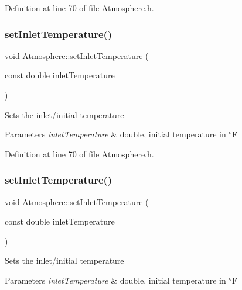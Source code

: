 Definition at line 70 of file Atmosphere.\+h.

\mbox{\label{class_atmosphere_a592bf7f82ea518fbd9da86d8f10cbc5c}} 
\subsubsection{\texorpdfstring{set\+Inlet\+Temperature()}{setInletTemperature()}\hspace{0.1cm}{\footnotesize\ttfamily [2/3]}}
{\footnotesize\ttfamily void Atmosphere\+::set\+Inlet\+Temperature (\begin{DoxyParamCaption}\item[{const double}]{inlet\+Temperature }\end{DoxyParamCaption})\hspace{0.3cm}{\ttfamily [inline]}}

Sets the inlet/initial temperature 
\begin{DoxyParams}{Parameters}
{\em inlet\+Temperature} & double, initial temperature in °F \\
\hline
\end{DoxyParams}


Definition at line 70 of file Atmosphere.\+h.

\mbox{\label{class_atmosphere_a592bf7f82ea518fbd9da86d8f10cbc5c}} 
\subsubsection{\texorpdfstring{set\+Inlet\+Temperature()}{setInletTemperature()}\hspace{0.1cm}{\footnotesize\ttfamily [3/3]}}
{\footnotesize\ttfamily void Atmosphere\+::set\+Inlet\+Temperature (\begin{DoxyParamCaption}\item[{const double}]{inlet\+Temperature }\end{DoxyParamCaption})\hspace{0.3cm}{\ttfamily [inline]}}

Sets the inlet/initial temperature 
\begin{DoxyParams}{Parameters}
{\em inlet\+Temperature} & double, initial temperature in °F \\
\hline
\end{DoxyParams}


